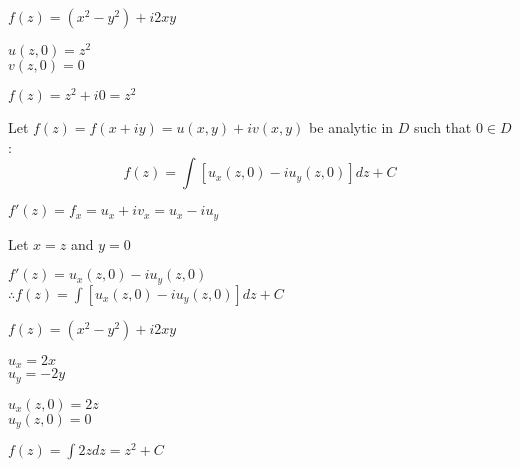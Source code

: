 \documentclass[letterpaper,12pt,fleqn]{article}
\begin{document}
\begin{example}
  $f(z)=(x^2-y^2)+i2xy$

  $u(z,0)=z^2$ \\
  $v(z,0)=0$

  $f(z)=z^2+i0=z^2$
\end{example}

\begin{theorem}
  Let $f(z)=f(x+iy)=u(x,y)+iv(x,y)$ be analytic in $D$ such that $0\in D$:
  \[f(z)=\int\left[u_x(z,0)-iu_y(z,0)\right]dz+C\]
\end{theorem}

\begin{theproof}
  $f'(z)=f_x=u_x+iv_x=u_x-iu_y$

  Let $x=z$ and $y=0$

  $f'(z)=u_x(z,0)-iu_y(z,0)$ \\
  $\therefore f(z)=\int\left[u_x(z,0)-iu_y(z,0)\right]dz+C$
\end{theproof}

\begin{example}
  $f(z)=(x^2-y^2)+i2xy$

  $u_x=2x$ \\
  $u_y=-2y$

  $u_x(z,0)=2z$ \\
  $u_y(z,0)=0$

  $f(z)=\int 2zdz=z^2+C$
\end{example}
\end{document}
